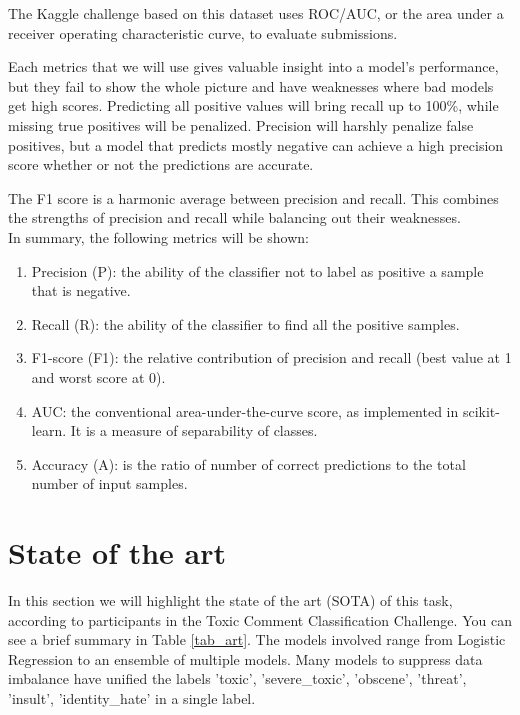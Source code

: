 \documentclass[10.5pt]{article}
\begin{document}
\vspace{0.3cm}
\begin{multicols*}{2}


The Kaggle challenge based on this dataset uses ROC/AUC, or the area under a receiver operating characteristic curve, to evaluate submissions.

Each metrics that we will use gives valuable insight into a model’s performance, but they fail to show the whole picture and have weaknesses where bad models get high scores. Predicting all positive values will bring recall up to 100\%, while missing true positives will be penalized. Precision will harshly penalize false positives, but a model that predicts mostly negative can achieve a high precision score whether or not the predictions are accurate.

The F1 score is a harmonic average between precision and recall. This combines the strengths of precision and recall while balancing out their weaknesses.\\

In summary, the following metrics will be shown:
\begin{enumerate}
  \item Precision (P): the ability of the classifier not to label as positive a sample that is negative.
  \item Recall (R): the ability of the classifier to find all the positive samples.
  \item F1-score (F1): the relative contribution of precision and recall (best value at 1 and worst score at 0).
  \item AUC: the conventional area-under-the-curve score, as implemented in scikit-learn. It is a measure of separability of classes.
  \item Accuracy (A): is the ratio of number of correct predictions to the total number of input samples.
\end{enumerate}

\section{State of the art}
In this section we will highlight the state of the art (SOTA) of this task, according to participants in the Toxic Comment Classification Challenge. You can see a brief summary in Table \ref{tab_art}. The models involved range from Logistic Regression to an ensemble of multiple models. Many models to suppress data imbalance have unified the labels 'toxic', 'severe\_toxic', 'obscene', 'threat', 'insult', 'identity\_hate' in a single label.
 

\end{multicols*}
\end{document}

